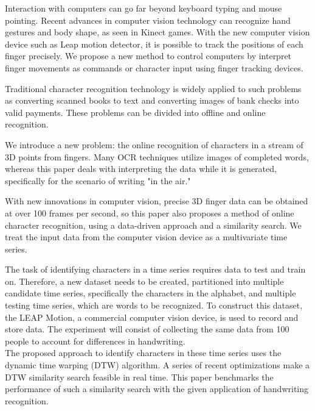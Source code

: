 Interaction with computers can go far beyond keyboard typing and mouse pointing. Recent advances in computer vision technology can recognize hand gestures and body shape, as seen in Kinect games. With the new computer vision device such as Leap motion detector, it is possible to track the positions of each finger precisely. We propose a new method to control computers by interpret finger movements as commands or character input using finger tracking devices. 

Traditional character recognition technology is widely applied to such problems as converting scanned books to text and converting images of bank checks into valid payments. These problems can be divided into offline and online recognition. 

We introduce a new problem: the online recognition of characters in a stream of 3D points from fingers. Many OCR techniques utilize images of completed words, whereas this paper deals with interpreting the data while it is generated, specifically for the scenario of writing "in the air."  

With new innovations in computer vision, precise 3D finger data can be obtained at over 100 frames per second, so this paper also proposes a method of online character recognition, using a data-driven approach and a similarity search. We treat the input data from the computer vision device as a multivariate time series.

The task of identifying characters in a time series requires data to test and train on. Therefore, a new dataset needs to be created, partitioned into multiple candidate time series, specifically the characters in the alphabet, and multiple testing time series, which are words to be recognized. To construct this dataset, the LEAP Motion, a commercial computer vision device, is used to record and store data. The experiment will consist of collecting the same data from 100 people to account for differences in handwriting.\\
The proposed approach to identify characters in these time series uses the dynamic time warping (DTW) algorithm. A series of recent optimizations make a DTW similarity search feasible in real time. This paper benchmarks the performance of such a similarity search with the given application of handwriting recognition.\\
